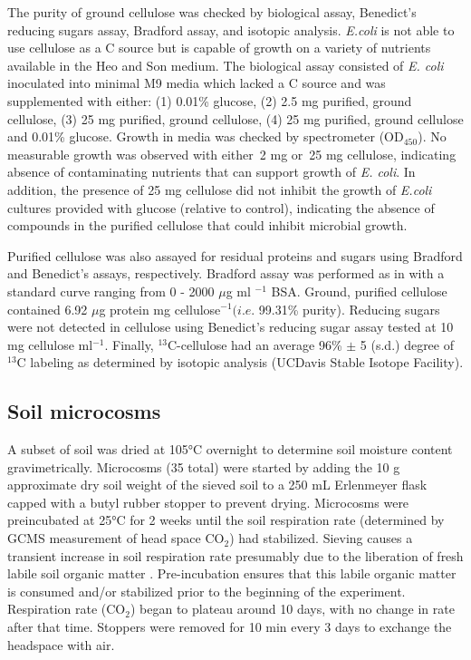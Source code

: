 \documentclass{article}
\begin{document}
The purity of ground cellulose was checked by biological assay, Benedict's
reducing sugars assay, Bradford assay, and isotopic analysis. \textit{E.coli}
is not able to use cellulose as a C source but is capable of growth on
a variety of nutrients available in the Heo and Son medium. The biological
assay consisted of \textit{E. coli} inoculated into minimal M9 media which
lacked a C source and was supplemented with either: (1) 0.01\% glucose, (2) 2.5
mg purified, ground cellulose, (3) 25 mg purified, ground cellulose, (4) 25 mg
purified, ground cellulose and 0.01\% glucose. Growth in media was checked by
spectrometer (OD$_{450}$). No measurable growth was observed with either~2 mg
or~25 mg cellulose, indicating absence of contaminating nutrients that can
support growth of \textit{E. coli}. In addition, the presence of 25 mg
cellulose did not inhibit the growth of \textit{E.coli} cultures provided with
glucose (relative to control), indicating the absence of compounds in the
purified cellulose that could inhibit microbial growth.

Purified cellulose was also assayed for residual proteins and sugars using
Bradford and Benedict's assays, respectively. Bradford assay was performed as
in \citep{Bradford_1976} with a standard curve ranging from 0 - 2000 $\mu$g ml
$^{-1}$ BSA. Ground, purified cellulose contained 6.92 $\mu$g protein mg
cellulose$^{-1} (\textit{i.e.}$ 99.31\% purity). Reducing sugars were not
detected in cellulose using Benedict's reducing sugar assay
\citep{benedict1909reagent} tested at 10 mg cellulose ml$^{-1}$. Finally,
$^{13}$C-cellulose had an average 96\% $\pm$
5 (s.d.) degree of $^{13}$C labeling as determined by isotopic analysis
  (UCDavis Stable Isotope Facility).           

\subsection{Soil microcosms}
A subset of soil was dried at 105°C overnight to determine soil moisture
content gravimetrically. Microcosms (35 total) were started by adding the
10 g approximate dry soil weight of the sieved soil to a 250 mL
Erlenmeyer flask capped with a butyl rubber stopper to prevent drying.
Microcosms were preincubated at 25°C for 2 weeks until the soil respiration
rate (determined by GCMS measurement of head space CO$_{2}$) had stabilized.
Sieving causes a transient increase in soil respiration rate presumably due to
the liberation of fresh labile soil organic matter \citep{Datta_2014}.
Pre-incubation ensures that this labile organic matter is consumed and/or
stabilized prior to the beginning of the experiment. Respiration rate
(CO$_{2}$) began to plateau around 10 days, with no change in rate after that
time. Stoppers were removed for 10 min every 3 days to exchange the headspace
with air. 
\end{document}
